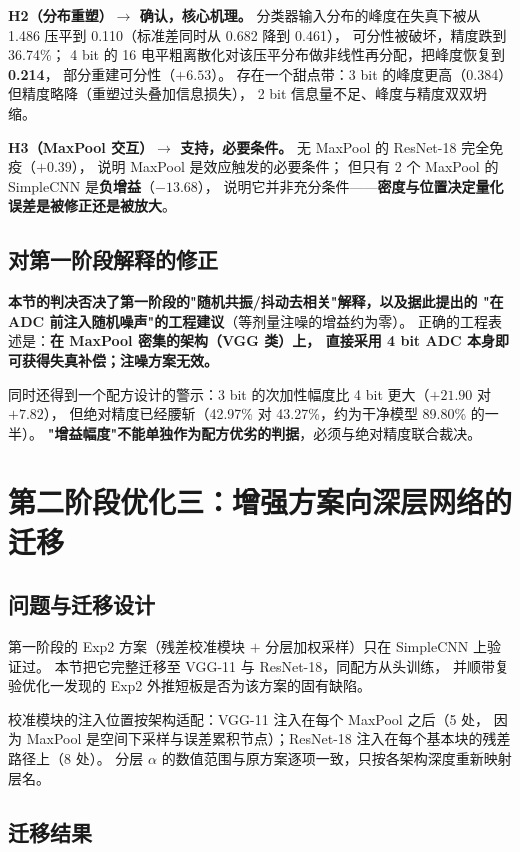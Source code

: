 \documentclass[11pt,a4paper]{ctexart}
\begin{document}
\textbf{H2（分布重塑）$\to$ 确认，核心机理。}
分类器输入分布的峰度在失真下被从 1.486 压平到 0.110（标准差同时从 0.682 降到 0.461），
可分性被破坏，精度跌到 36.74\%；
4 bit 的 16 电平粗离散化对该压平分布做非线性再分配，把峰度恢复到 \textbf{0.214}，
部分重建可分性（$+6.53$）。
存在一个甜点带：3 bit 的峰度更高（0.384）但精度略降（重塑过头叠加信息损失），
2 bit 信息量不足、峰度与精度双双坍缩。

\textbf{H3（MaxPool 交互）$\to$ 支持，必要条件。}
无 MaxPool 的 ResNet-18 完全免疫（$+0.39$），
说明 MaxPool 是效应触发的必要条件；
但只有 2 个 MaxPool 的 SimpleCNN 是\textbf{负增益}（$-13.68$），
说明它并非充分条件——\textbf{密度与位置决定量化误差是被修正还是被放大}。

\subsection{对第一阶段解释的修正}

\textbf{本节的判决否决了第一阶段的"随机共振/抖动去相关"解释，以及据此提出的
"在 ADC 前注入随机噪声"的工程建议}（等剂量注噪的增益约为零）。
正确的工程表述是：\textbf{在 MaxPool 密集的架构（VGG 类）上，
直接采用 4 bit ADC 本身即可获得失真补偿；注噪方案无效。}

同时还得到一个配方设计的警示：3 bit 的次加性幅度比 4 bit 更大（$+21.90$ 对 $+7.82$），
但绝对精度已经腰斩（42.97\% 对 43.27\%，约为干净模型 89.80\% 的一半）。
\textbf{"增益幅度"不能单独作为配方优劣的判据}，必须与绝对精度联合裁决。

\section{第二阶段优化三：增强方案向深层网络的迁移}
\label{sec:ext6}

\subsection{问题与迁移设计}

第一阶段的 Exp2 方案（残差校准模块 $+$ 分层加权采样）只在 SimpleCNN 上验证过。
本节把它完整迁移至 VGG-11 与 ResNet-18，同配方从头训练，
并顺带复验优化一发现的 Exp2 外推短板是否为该方案的固有缺陷。

校准模块的注入位置按架构适配：VGG-11 注入在每个 MaxPool 之后（5 处，
因为 MaxPool 是空间下采样与误差累积节点）；ResNet-18 注入在每个基本块的残差路径上（8 处）。
分层 $\alpha$ 的数值范围与原方案逐项一致，只按各架构深度重新映射层名。

\subsection{迁移结果}
\end{document}
